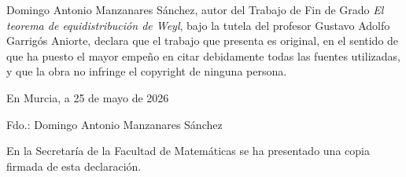 Domingo Antonio Manzanares Sánchez, autor del Trabajo de Fin de Grado \textit{El teorema de equidistribución de Weyl}, bajo la tutela del profesor Gustavo Adolfo Garrigós Aniorte, declara que el trabajo que presenta es original, en el sentido de que ha puesto el mayor empeño en citar debidamente todas las fuentes utilizadas, y que la obra no infringe el copyright de ninguna persona.
\begin{center}
En Murcia, a 25 de mayo de 2026
\end{center}

\vspace{2cm}

\begin{center}
    Fdo.: Domingo Antonio Manzanares Sánchez
\end{center}

\vfill

{\footnotesize
En la Secretaría de la Facultad de Matemáticas se ha presentado una copia firmada de esta declaración.
}